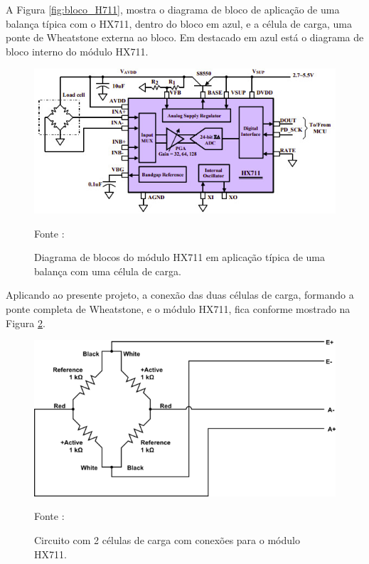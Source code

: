 \par A Figura \ref{fig:bloco_H711}, mostra o diagrama de bloco de aplicação de uma balança típica com o HX711, dentro do bloco em azul, e a célula de carga, uma ponte de Wheatstone externa ao bloco. Em destacado em azul está o diagrama de bloco interno do módulo HX711.

\begin{figure}[H]
  \centering
  \includegraphics[scale=0.4]{figuras/blocoHX711.jpeg}
  \caption{Diagrama de blocos do módulo HX711 em aplicação típica de uma balança com uma célula de carga.} 
  {\footnotesize Fonte : \cite{avia_HX711} } 
  \label{fig:bloco_HX711}
\end{figure}

Aplicando ao presente projeto, a conexão das duas células de carga, formando a ponte completa de Wheatstone, e o módulo HX711, fica conforme mostrado na Figura \ref{fig:Circuit_balanca}.

\begin{figure}[H]
  \centering
  \includegraphics[scale=0.4]{figuras/Circuit_balanca.png}
  \caption{Circuito com 2 células de carga com conexões para o módulo HX711.} 
  {\footnotesize Fonte : \cite{half_wheatstone} } 
  \label{fig:Circuit_balanca}
\end{figure}

